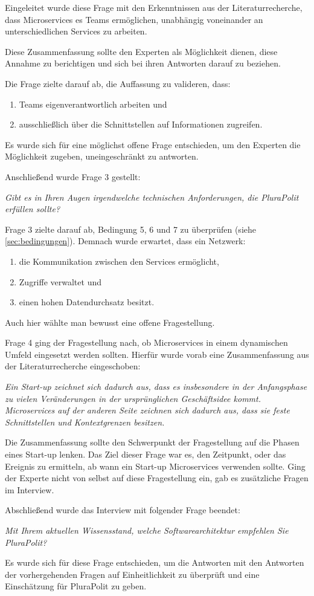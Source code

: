 Eingeleitet wurde diese Frage mit den Erkenntnissen aus der Literaturrecherche, dass Microservices es Teams ermöglichen, unabhängig voneinander an unterschiedlichen Services zu arbeiten.

Diese Zusammenfassung sollte den Experten als Möglichkeit dienen, diese Annahme zu berichtigen und sich bei ihren Antworten darauf zu beziehen.

Die Frage zielte darauf ab, die Auffassung zu valideren, dass:
\begin{enumerate}
	\item Teams eigenverantwortlich arbeiten und
	\item ausschließlich über die Schnittstellen auf Informationen zugreifen.
\end{enumerate}
Es wurde sich für eine möglichst offene Frage entschieden, um den Experten die Möglichkeit zugeben, uneingeschränkt zu antworten.

Anschließend wurde Frage 3 gestellt:

\textit{Gibt es in Ihren Augen irgendwelche technischen Anforderungen, die PluraPolit erfüllen sollte? }

Frage 3 zielte darauf ab, Bedingung 5, 6 und 7 zu überprüfen (siehe \cref{sec:bedingungen}). Demnach wurde erwartet, dass ein Netzwerk: 

\begin{enumerate}
	\item die Kommunikation zwischen den Services ermöglicht,
	\item Zugriffe verwaltet und
	\item einen hohen Datendurchsatz besitzt.
\end{enumerate}

Auch hier wählte man bewusst eine offene Fragestellung.

Frage 4 ging der Fragestellung nach, ob Microservices in einem dynamischen Umfeld eingesetzt werden sollten. Hierfür wurde vorab eine Zusammenfassung aus der Literaturrecherche eingeschoben:

\textit{Ein Start-up zeichnet sich dadurch aus, dass es insbesondere in der Anfangsphase zu vielen Veränderungen in der ursprünglichen Geschäftsidee kommt. Microservices auf der anderen Seite zeichnen sich dadurch aus, dass sie feste Schnittstellen und Kontextgrenzen besitzen.}

Die Zusammenfassung sollte den Schwerpunkt der Fragestellung auf die Phasen eines Start-up lenken. Das Ziel dieser Frage war es, den Zeitpunkt, oder das Ereignis zu ermitteln, ab wann ein Start-up Microservices verwenden sollte. Ging der Experte nicht von selbst auf diese Fragestellung ein, gab es zusätzliche Fragen im Interview.

Abschließend wurde das Interview mit folgender Frage beendet:

\textit{Mit Ihrem aktuellen Wissensstand, welche Softwarearchitektur empfehlen Sie PluraPolit?}

Es wurde sich für diese Frage entschieden, um die Antworten mit den Antworten der vorhergehenden Fragen auf Einheitlichkeit zu überprüft und eine Einschätzung für PluraPolit zu geben.
